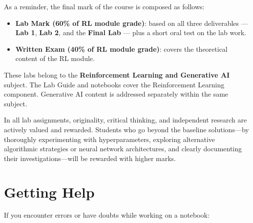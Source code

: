 \documentclass[11pt,a4paper]{article}
\begin{document}
As a reminder, the final mark of the course is composed as follows:

\begin{itemize}
    \item \textbf{Lab Mark (60\% of RL module grade)}: based on all three deliverables — \textbf{Lab 1}, \textbf{Lab 2}, and the \textbf{Final Lab} — plus a short oral test on the lab work.
    \item \textbf{Written Exam (40\% of RL module grade)}: covers the theoretical content of the RL module.
\end{itemize}

\begin{infobox}
These labs belong to the \textbf{Reinforcement Learning and Generative AI} subject. The Lab Guide and notebooks cover the Reinforcement Learning component. Generative AI content is addressed separately within the same subject.
\end{infobox}

\begin{infobox}
In all lab assignments, originality, critical thinking, and independent research are actively valued and rewarded. Students who go beyond the baseline solutions—by thoroughly experimenting with hyperparameters, exploring alternative algorithmic strategies or neural network architectures, and clearly documenting their investigations—will be rewarded with higher marks.
\end{infobox}

\section{Getting Help}

If you encounter errors or have doubts while working on a notebook:
\end{document}
